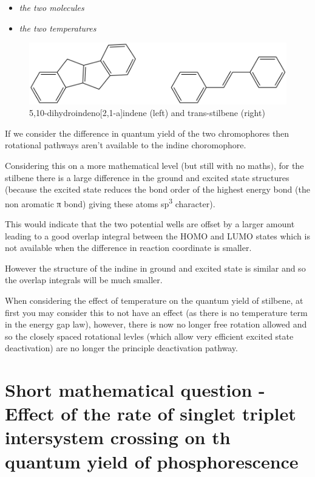 \documentclass[
]{book}
\providecommand{\tightlist}{%
  \setlength{\itemsep}{0pt}\setlength{\parskip}{0pt}}
\begin{document}
\begin{itemize}
\tightlist
\item
  \emph{the two molecules}
\item
  \emph{the two temperatures}
\end{itemize}

\begin{figure}

{\centering \includegraphics[width=0.6\linewidth]{Images/stilbeneindene} 

}

\caption{5,10-dihydroindeno[2,1-a]indene (left) and trans-stilbene (right)}\label{fig:stilbeneindene}
\end{figure}

If we consider the difference in quantum yield of the two chromophores then rotational pathways aren't available to the indine choromophore.

Considering this on a more mathematical level (but still with no maths), for the stilbene there is a large difference in the ground and excited state structures (because the excited state reduces the bond order of the highest energy bond (the non aromatic π bond) giving these atoms sp\textsuperscript{3} character).

This would indicate that the two potential wells are offset by a larger amount leading to a good overlap integral between the HOMO and LUMO states which is not available when the difference in reaction coordinate is smaller.

However the structure of the indine in ground and excited state is similar and so the overlap integrals will be much smaller.

When considering the effect of temperature on the quantum yield of stilbene, at first you may consider this to not have an effect (as there is no temperature term in the energy gap law), however, there is now no longer free rotation allowed and so the closely spaced rotational levles (which allow very efficient excited state deactivation) are no longer the principle deactivation pathway.

\hypertarget{sec:ratephos}{%
\section{Short mathematical question - Effect of the rate of singlet triplet intersystem crossing on th quantum yield of phosphorescence}\label{sec:ratephos}}
\end{document}
